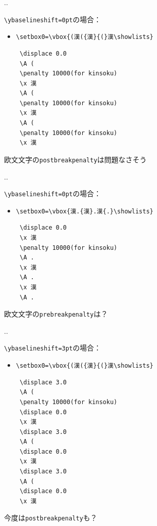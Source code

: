 \documentclass[a5paper,dvipdfmx,14pt]{beamer}
\def\cs#1{\texttt{\char92\nobreak#1}}
\begin{document}

\begin{frame}[t,fragile]{\insertsectionnumber.\insertsubsectionnumber. \insertsubsection}{}
{\small
\verb+\ybaselineshift=0pt+の場合：
\begin{itemize}
  \item \verb+\setbox0=\vbox{(漢({漢}{(}漢\showlists}+
\begin{verbnote}
\begin{verbatim}
 \displace 0.0
 \A (
 \penalty 10000(for kinsoku)
 \x 漢
 \A (
 \penalty 10000(for kinsoku)
 \x 漢
 \A (
 \penalty 10000(for kinsoku)
 \x 漢
\end{verbatim}
\end{verbnote}
\end{itemize}\vskip-25pt
欧文文字の\cs{postbreakpenalty}は問題なさそう
}
\end{frame}

\begin{frame}[t,fragile]{\insertsectionnumber.\insertsubsectionnumber. \insertsubsection}{}
{\small
\verb+\ybaselineshift=0pt+の場合：
\begin{itemize}
  \item \verb+\setbox0=\vbox{漢.{漢}.漢{.}\showlists}+
\begin{verbnote}
\begin{verbatim}
 \displace 0.0
 \x 漢
 \penalty 10000(for kinsoku)
 \A .
 \x 漢
 \A .
 \x 漢
 \A .
\end{verbatim}
\end{verbnote}
\end{itemize}\vskip-25pt
欧文文字の\cs{prebreakpenalty}は？
}
\end{frame}

\begin{frame}[t,fragile]{\insertsectionnumber.\insertsubsectionnumber. \insertsubsection}{}
{\small\def\verbnotesize{\scriptsize}
\verb+\ybaselineshift=3pt+の場合：
\begin{itemize}
  \item \verb+\setbox0=\vbox{(漢({漢}{(}漢\showlists}+
\begin{verbnote}
\begin{verbatim}
 \displace 3.0
 \A (
 \penalty 10000(for kinsoku)
 \displace 0.0
 \x 漢
 \displace 3.0
 \A (
 \displace 0.0
 \x 漢
 \displace 3.0
 \A (
 \displace 0.0
 \x 漢
\end{verbatim}
\end{verbnote}
\end{itemize}\vskip-25pt
今度は\cs{postbreakpenalty}も？
}
\end{frame}
\end{document}
